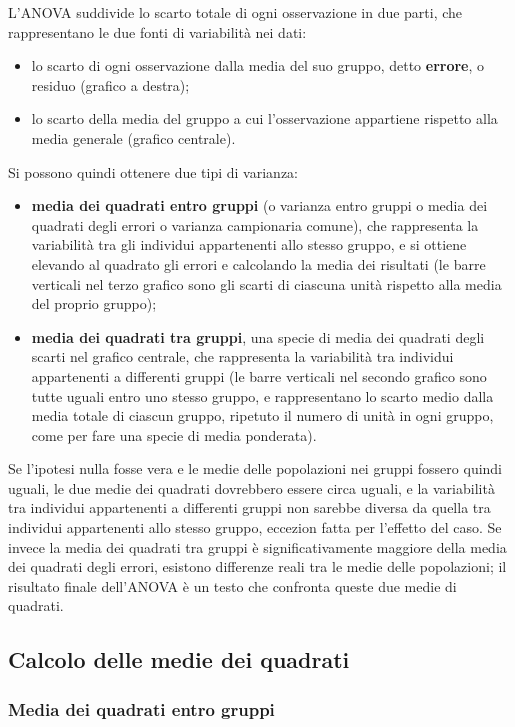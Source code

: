 \documentclass[10pt, draft]{book}
\newcommand{\tightlist}{%
\setlength{\itemsep}{1pt}\setlength{\parskip}{0pt}\setlength{\parsep}{0pt}}
\begin{document}
L'ANOVA suddivide lo scarto totale di ogni osservazione in due parti, che rappresentano le due fonti di variabilità nei dati: 
    \begin{itemize}\tightlist
        \item lo scarto di ogni osservazione dalla media del suo gruppo, detto \textbf{errore}, o residuo (grafico a destra);
        \item lo scarto della media del gruppo a cui l'osservazione appartiene rispetto alla media generale (grafico centrale).
    \end{itemize}
Si possono quindi ottenere due tipi di varianza:
    \begin{itemize}\tightlist
        \item \textbf{media dei quadrati entro gruppi} (o varianza entro gruppi o media dei quadrati degli errori o varianza campionaria comune), che rappresenta la variabilità tra gli individui appartenenti allo stesso gruppo, e si ottiene elevando al quadrato gli errori e calcolando la media dei risultati (le barre verticali nel terzo grafico sono gli scarti di ciascuna unità rispetto alla media del proprio gruppo);
        \item \textbf{media dei quadrati tra gruppi}, una specie di media dei quadrati degli scarti nel grafico centrale, che rappresenta la variabilità tra individui appartenenti a differenti gruppi (le barre verticali nel secondo grafico sono tutte uguali entro uno stesso gruppo, e rappresentano lo scarto medio dalla media totale di ciascun gruppo, ripetuto il numero di unità in ogni gruppo, come per fare una specie di media ponderata).
    \end{itemize}
Se l'ipotesi nulla fosse vera e le medie delle popolazioni nei gruppi fossero 
quindi uguali, le due medie dei quadrati dovrebbero essere circa uguali, e la variabilità tra individui appartenenti a differenti gruppi non sarebbe diversa da quella tra individui appartenenti allo stesso gruppo, eccezion fatta per l'effetto del caso. Se invece la media dei quadrati tra gruppi è significativamente maggiore della media dei quadrati degli errori, esistono differenze reali tra le medie delle popolazioni; il risultato finale dell'ANOVA è un testo che confronta queste due medie di quadrati.

\subsection{Calcolo delle medie dei quadrati}

\subsubsection{Media dei quadrati entro gruppi}
\end{document}
